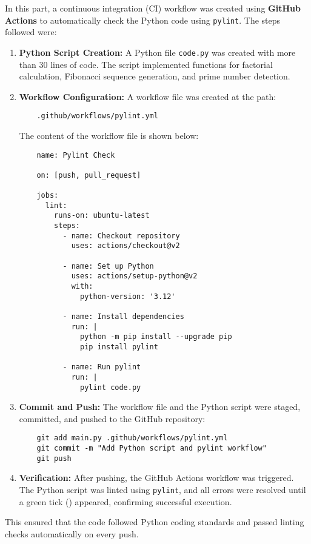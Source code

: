 \documentclass[12pt, a4paper]{report}
\begin{document}
In this part, a continuous integration (CI) workflow was created using \textbf{GitHub Actions} to automatically check the Python code using \texttt{pylint}. The steps followed were:

\begin{enumerate}
    \item \textbf{Python Script Creation:}  
    A Python file \texttt{code.py} was created with more than 30 lines of code. The script implemented functions for factorial calculation, Fibonacci sequence generation, and prime number detection.

    \item \textbf{Workflow Configuration:}  
    A workflow file was created at the path:
    \begin{verbatim}
    .github/workflows/pylint.yml
    \end{verbatim}

    The content of the workflow file is shown below:
    \begin{verbatim}
    name: Pylint Check

    on: [push, pull_request]

    jobs:
      lint:
        runs-on: ubuntu-latest
        steps:
          - name: Checkout repository
            uses: actions/checkout@v2

          - name: Set up Python
            uses: actions/setup-python@v2
            with:
              python-version: '3.12'

          - name: Install dependencies
            run: |
              python -m pip install --upgrade pip
              pip install pylint

          - name: Run pylint
            run: |
              pylint code.py
    \end{verbatim}

    \item \textbf{Commit and Push:}  
    The workflow file and the Python script were staged, committed, and pushed to the GitHub repository:
    \begin{verbatim}
    git add main.py .github/workflows/pylint.yml
    git commit -m "Add Python script and pylint workflow"
    git push
    \end{verbatim}

    \item \textbf{Verification:}  
    After pushing, the GitHub Actions workflow was triggered. The Python script was linted using \texttt{pylint}, and all errors were resolved until a green tick (\checkmark) appeared, confirming successful execution.
\end{enumerate}
This ensured that the code followed Python coding standards and passed linting checks automatically on every push.
\end{document}

